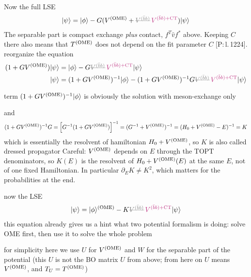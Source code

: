 \documentclass[11pt]{article}
\newcommand{\tagP}[1]{\textcolor{blue!65!black}{\textsf{\small[P:\,#1]}}}
\newcommand{\tagD}{\textcolor{orange!85!black}{\textsf{\small[D]}}}
\newcommand{\ai}[1]{\textcolor{aicolor}{#1}}
\newcommand{\aifixm}[2]{\textcolor{gray}{\text{\sout{$#1$}}}\,\textcolor{aicolor}{#2}}
\newcommand{\ai}[1]{#1}
\newcommand{\aifixm}[2]{#2}
\begin{document}
%
%
Now the full LSE
\[
	\lvert \psi \rangle = \lvert \phi \rangle - G(\VOME + \aifixm{\VQQ}{V^{(\bar bb)+{\rm CT}}}) \lvert \psi \rangle
\]
\ai{The separable part is compact exchange \emph{plus} contact, $f^T\hat vf^*$ above. Keeping $C$ there also means that $T^{\rm (OME)}$ does not depend on the fit parameter $C$ \tagP{l.\,1224}.}
reorganize the equation
\begin{align}
	(1 + G \VOME)\lvert \psi \rangle & = \lvert \phi \rangle - G \aifixm{\VQQ}{V^{(\bar bb)+{\rm CT}}} \lvert \psi \rangle                                    \\
	\lvert \psi \rangle              & = (1 + G \VOME)^{-1}\lvert \phi \rangle - (1 + G\VOME)^{-1}G \aifixm{\VQQ}{V^{(\bar bb)+{\rm CT}}} \lvert \psi \rangle
\end{align}

term $(1 + GV^{\rm (OME)})^{-1}\lvert \phi \rangle$ is obviously the solution with meson-exchange only

and
\[
	(1 + GV^{\rm (OME)})^{-1}G = \left[G^{-1}(1 + GV^{\rm (OME)})\right]^{-1} = (G^{-1} + V^{\rm (OME)})^{-1} = (H_0 + V^{\rm (OME)} - E)^{-1} = K
\]
which is essentially the resolvent of hamiltonian $H_0 + V^{\rm (OME)}$, so $K$ is also called dressed propagator \ai{Careful: $V^{\rm (OME)}$ depends on $E$ through the TOPT denominators, so $K(E)$ is the resolvent of $H_0+V^{\rm (OME)}(E)$ at the same $E$, not of one fixed Hamiltonian. In particular $\partial_EK\neq K^2$, which matters for the probabilities at the end.}

now the LSE
\[
	\lvert \psi \rangle = \lvert \phi \rangle ^{\rm (OME)} - K\aifixm{\VQQ}{V^{(\bar bb)+{\rm CT}}}\lvert \psi \rangle
\]
this equation already gives us a hint what two potential formalism is doing: solve OME first, then use it to solve the whole problem

for simplicity here we use $U$ for $V^{\rm (OME)}$ and $W$ for the separable part of the potential \ai{(this $U$ is not the BO matrix $U$ from above; from here on $U$ means $V^{\rm (OME)}$, and $T_U=T^{\rm (OME)}$)}
\end{document}
